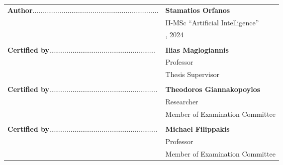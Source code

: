\newpage
\thispagestyle{empty}


\begin{flushleft}
    \begin{tabularx}{\textwidth}{X l}
        \textbf{Author}................................................................. & \textbf{Stamatios Orfanos} \\
        & II-MSc “Artificial Intelligence” \\
        &  , 2024 \\
        \\
        \textbf{Certified by}....................................................... & \textbf{Ilias Maglogiannis} \\
        & Professor \\
        & Thesis Supervisor \\
        \\
        \textbf{Certified by}........................................................ & \textbf{Theodoros Giannakopoylos} \\
        & Researcher \\
        & Member of Examination Committee \\
        \\
        \textbf{Certified by}........................................................ & \textbf{Michael Filippakis} \\
        & Professor \\
        & Member of Examination Committee \\
    \end{tabularx}
\end{flushleft}
